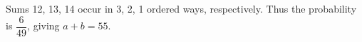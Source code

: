 Sums 12, 13, 14 occur in 3, 2, 1 ordered ways, respectively. Thus the probability is $\dfrac{6}{49}$, giving $\boxed{a+b=55}$.
